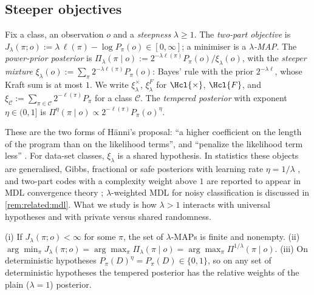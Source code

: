 \subsection{Steeper objectives}\label{sec:setup:objectives}

\begin{definition}\label{def:setup:objectives}
Fix a class, an observation $o$ and a \emph{steepness} $\lambda\ge1$. The \emph{two-part objective} is $J_\lambda(\pi;o):=\lambda\,\ell(\pi)-\log P_\pi(o)\in[0,\infty]$; a minimiser is a \emph{$\lambda$-MAP}. The \emph{power-prior posterior} is $\Pi_\lambda(\pi\mid o):=2^{-\lambda\ell(\pi)}P_\pi(o)/\xi_\lambda(o)$, with the \emph{steeper mixture} $\xi_\lambda(o):=\sum_\pi2^{-\lambda\ell(\pi)}P_\pi(o)$: Bayes' rule with the prior $2^{-\lambda\ell}$, whose Kraft sum is at most $1$. We write $\xi^\times_\lambda$, $\xi^F_\lambda$ for $\Hcl{\times}$, $\Hcl{F}$, and $\xi_{\mathcal C}:=\sum_{\pi\in\mathcal C}2^{-\ell(\pi)}P_\pi$ for a class $\mathcal C$. The \emph{tempered posterior} with exponent $\eta\in(0,1]$ is $\Pi^\eta(\pi\mid o)\propto2^{-\ell(\pi)}P_\pi(o)^\eta$.
\end{definition}

These are the two forms of H\"anni's proposal: ``a higher coefficient on the length of the program than on the likelihood terms'', and ``penalize the likelihood term less'' \citep{hanni2026notes,hanni2026lesswrong}. For data-set classes, $\xi_\lambda$ is a shared hypothesis. In statistics these objects are generalised, Gibbs, fractional or safe posteriors with learning rate $\eta=1/\lambda$ \citep{zhang2006epsilon,bissiri2016general,bhattacharya2019fractional,grunwald2012safe,grunwald2017inconsistency}, and two-part codes with a complexity weight above $1$ are reported to appear in MDL convergence theory \citep{barron1991minimum,grunwald2007minimum}; $\lambda$-weighted MDL for noisy classification is discussed in \cref{rem:related:mdl}. What we study is how $\lambda>1$ interacts with universal hypotheses and with private versus shared randomness.

\begin{lemma}\label{lem:setup:basic}
(i) If $J_\lambda(\pi;o)<\infty$ for some $\pi$, the set of $\lambda$-MAPs is finite and nonempty.
(ii) $\arg\min_\pi J_\lambda(\pi;o)=\arg\max_\pi\Pi_\lambda(\pi\mid o)=\arg\max_\pi\Pi^{1/\lambda}(\pi\mid o)$.
(iii) On deterministic hypotheses $P_\pi(D)^\eta=P_\pi(D)\in\{0,1\}$, so on any set of deterministic hypotheses the tempered posterior has the relative weights of the plain ($\lambda=1$) posterior.
\end{lemma}

